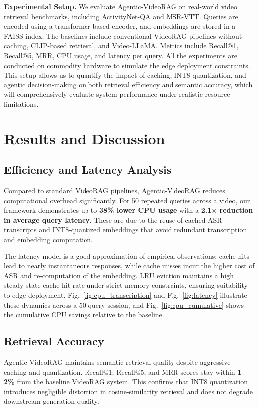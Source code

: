 \documentclass[conference,twocolumn]{IEEEtran}
\begin{document}
\textbf{Experimental Setup.} We evaluate Agentic-VideoRAG on real-world video retrieval benchmarks, including ActivityNet-QA and MSR-VTT. Queries are encoded using a transformer-based encoder, and embeddings are stored in a FAISS index. The baselines include conventional VideoRAG pipelines without caching, CLIP-based retrieval, and Video-LLaMA. Metrics include Recall@1, Recall@5, MRR, CPU usage, and latency per query. All the experiments are conducted on commodity hardware to simulate the edge deployment constraints. This setup allows us to quantify the impact of caching, INT8 quantization, and agentic decision-making on both retrieval efficiency and semantic accuracy, which will comprehensively evaluate system performance under realistic resource limitations.

\section{Results and Discussion}

\subsection{Efficiency and Latency Analysis}
Compared to standard VideoRAG pipelines, Agentic-VideoRAG reduces computational overhead significantly. For 50 repeated queries across a video, our framework demonstrates up to \textbf{38\% lower CPU usage} with a \textbf{2.1$\times$ reduction in average query latency}. These are due to the reuse of cached ASR transcripts and INT8-quantized embeddings that avoid redundant transcription and embedding computation.

The latency model is a good approximation of empirical observations: cache hits lead to nearly instantaneous responses, while cache misses incur the higher cost of ASR and re-computation of the embedding. LRU eviction maintains a high steady-state cache hit rate under strict memory constraints, ensuring suitability to edge deployment. Fig.~\ref{fig:cpu_transcription} and Fig.~\ref{fig:latency} illustrate these dynamics across a 50-query session, and Fig.~\ref{fig:cpu_cumulative} shows the cumulative CPU savings relative to the baseline.

\subsection{Retrieval Accuracy}
Agentic-VideoRAG maintains semantic retrieval quality despite aggressive caching and quantization. Recall@1, Recall@5, and MRR scores stay within \textbf{1--2\%} from the baseline VideoRAG system. This confirms that INT8 quantization introduces negligible distortion in cosine-similarity retrieval and does not degrade downstream generation quality.
\end{document}

